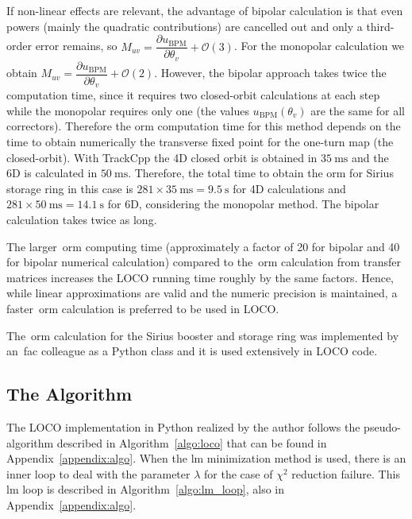 If non-linear effects are relevant, the advantage of bipolar calculation is that even powers (mainly the quadratic contributions) are cancelled out and only a third-order error remains, so $M_{uv} = \dfrac{\partial u_{\mathrm{BPM}}}{\partial \theta_v} + \mathcal{O}(3)$. For the monopolar calculation we obtain $M_{uv} = \dfrac{\partial u_{\mathrm{BPM}}}{\partial \theta_v} + \mathcal{O}(2)$. However, the bipolar approach takes twice the computation time, since it requires two closed-orbit calculations at each step while the monopolar requires only one (the values $u_{\mathrm{BPM}}\left(\theta_v \right)$ are the same for all correctors). Therefore the \gls{orm} computation time for this method depends on the time to obtain numerically the transverse fixed point for the one-turn map (the closed-orbit). With TrackCpp the 4D closed orbit is obtained in $\SI{35}{\milli\second}$ and the 6D is calculated in $\SI{50}{\milli\second}$. Therefore, the total time to obtain the \gls{orm} for Sirius storage ring in this case is $281 \times \SI{35}{\milli\second} = \SI{9.5}{\second}$ for 4D calculations and $281 \times \SI{50}{\milli\second} = \SI{14.1}{\second}$ for 6D, considering the monopolar method. The bipolar calculation takes twice as long.

The larger~\gls{orm} computing time (approximately a factor of 20 for bipolar and 40 for bipolar numerical calculation) compared to the~\gls{orm} calculation from transfer matrices increases the LOCO running time roughly by the same factors. Hence, while linear approximations are valid and the numeric precision is maintained, a faster~\gls{orm} calculation is preferred to be used in LOCO.

The~\gls{orm} calculation for the Sirius booster and storage ring was implemented by an~\gls{fac} colleague as a Python class and it is used extensively in LOCO code.
\subsection{The Algorithm}
The LOCO implementation in Python realized by the author follows the pseudo-algorithm described in Algorithm~\ref{algo:loco} that can be found in Appendix~\ref{appendix:algo}. When the \gls{lm} minimization method is used, there is an inner loop to deal with the parameter $\lambda$ for the case of $\chi^2$ reduction failure. This \gls{lm} loop is described in Algorithm~\ref{algo:lm_loop}, also in Appendix~\ref{appendix:algo}.

